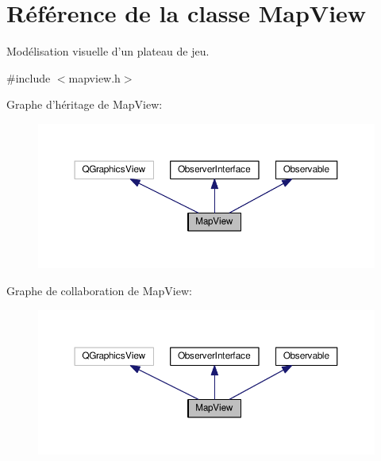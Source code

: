 \hypertarget{classMapView}{\section{Référence de la classe Map\+View}
\label{classMapView}
}


Modélisation visuelle d’un plateau de jeu.  




{\ttfamily \#include $<$mapview.\+h$>$}



Graphe d'héritage de Map\+View\+:\nopagebreak
\begin{figure}[H]
\begin{center}
\leavevmode
\includegraphics[width=350pt]{d6/d58/classMapView__inherit__graph}
\end{center}
\end{figure}


Graphe de collaboration de Map\+View\+:\nopagebreak
\begin{figure}[H]
\begin{center}
\leavevmode
\includegraphics[width=350pt]{d1/d7b/classMapView__coll__graph}
\end{center}
\end{figure}
